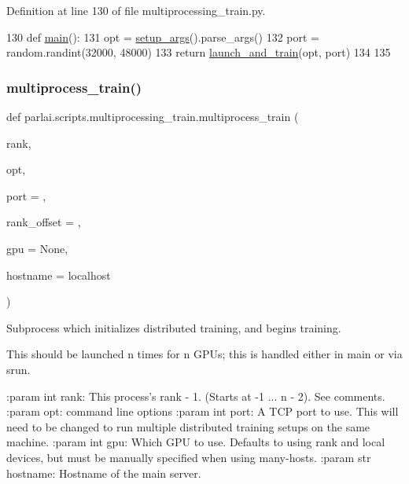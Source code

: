 Definition at line 130 of file multiprocessing\+\_\+train.\+py.


\begin{DoxyCode}
130 \textcolor{keyword}{def }\hyperlink{namespaceparlai_1_1scripts_1_1multiprocessing__train_aa7b2a133561ac5212f3ee9814a645522}{main}():
131     opt = \hyperlink{namespaceparlai_1_1scripts_1_1multiprocessing__train_a1ee26bddeb470040cfbceb5ee7a9fa08}{setup\_args}().parse\_args()
132     port = random.randint(32000, 48000)
133     \textcolor{keywordflow}{return} \hyperlink{namespaceparlai_1_1scripts_1_1multiprocessing__train_a5dc8df166f1c025b54f7420a1ab2f812}{launch\_and\_train}(opt, port)
134 
135 
\end{DoxyCode}
\mbox{\label{namespaceparlai_1_1scripts_1_1multiprocessing__train_aa979267c9eb44bbdfcd25a6d69a58cc4}} 
\subsubsection{\texorpdfstring{multiprocess\+\_\+train()}{multiprocess\_train()}}
{\footnotesize\ttfamily def parlai.\+scripts.\+multiprocessing\+\_\+train.\+multiprocess\+\_\+train (\begin{DoxyParamCaption}\item[{}]{rank,  }\item[{}]{opt,  }\item[{}]{port = {},  }\item[{}]{rank\+\_\+offset = {},  }\item[{}]{gpu = {\ttfamily None},  }\item[{}]{hostname = {\ttfamily \textquotesingle{}localhost\textquotesingle{}} }\end{DoxyParamCaption})}

\begin{DoxyVerb}Subprocess which initializes distributed training, and begins training.

This should be launched n times for n GPUs; this is handled either in main
or via srun.

:param int rank: This process's rank - 1. (Starts at -1 ... n - 2). See comments.
:param opt: command line options
:param int port: A TCP port to use. This will need to be changed to run
    multiple distributed training setups on the same machine.
:param int gpu: Which GPU to use. Defaults to using rank and local devices,
    but must be manually specified when using many-hosts.
:param str hostname: Hostname of the main server.
\end{DoxyVerb}
 

